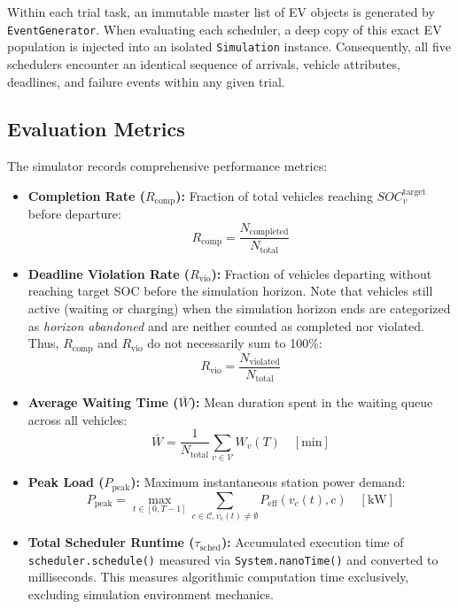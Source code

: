 \documentclass[conference]{IEEEtran}
\begin{document}
Within each trial task, an immutable master list of EV objects is generated by \texttt{EventGenerator}. When evaluating each scheduler, a deep copy of this exact EV population is injected into an isolated \texttt{Simulation} instance. Consequently, all five schedulers encounter an identical sequence of arrivals, vehicle attributes, deadlines, and failure events within any given trial.

\subsection{Evaluation Metrics}
The simulator records comprehensive performance metrics:
\begin{itemize}
    \item \textbf{Completion Rate ($R_{\mathrm{comp}}$):} Fraction of total vehicles reaching $SOC_v^{\mathrm{target}}$ before departure:
    \begin{equation}
    R_{\mathrm{comp}} = \frac{N_{\mathrm{completed}}}{N_{\mathrm{total}}}
    \end{equation}
    \item \textbf{Deadline Violation Rate ($R_{\mathrm{vio}}$):} Fraction of vehicles departing without reaching target SOC before the simulation horizon. Note that vehicles still active (waiting or charging) when the simulation horizon ends are categorized as \emph{horizon abandoned} and are neither counted as completed nor violated. Thus, $R_{\mathrm{comp}}$ and $R_{\mathrm{vio}}$ do not necessarily sum to 100\%:
\begin{equation}
R_{\mathrm{vio}} = \frac{N_{\mathrm{violated}}}{N_{\mathrm{total}}}
\end{equation}
    \item \textbf{Average Waiting Time ($\bar{W}$):} Mean duration spent in the waiting queue across all vehicles:
    \begin{equation}
    \bar{W} = \frac{1}{N_{\mathrm{total}}} \sum_{v \in \mathcal{V}} W_v(T) \quad [\text{min}]
    \end{equation}
    \item \textbf{Peak Load ($P_{\mathrm{peak}}$):} Maximum instantaneous station power demand:
    \begin{equation}
    P_{\mathrm{peak}} = \max_{t \in [0, T-1]} \sum_{c \in \mathcal{C}, v_c(t) \neq \emptyset} P_{\mathrm{eff}}(v_c(t), c) \quad [\text{kW}]
    \end{equation}
    \item \textbf{Total Scheduler Runtime ($\tau_{\mathrm{sched}}$):} Accumulated execution time of \texttt{scheduler.schedule()} measured via \texttt{System.nanoTime()} and converted to milliseconds. This measures algorithmic computation time exclusively, excluding simulation environment mechanics.
\end{itemize}
\end{document}
